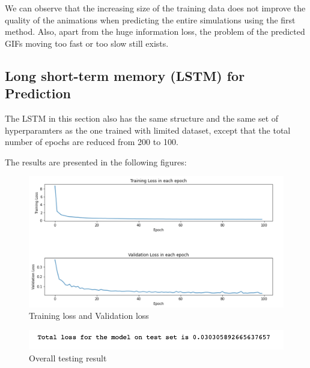 We can observe that the increasing size of the training data does not improve the quality of the animations when predicting the entire simulations using the first method. Also, apart from the huge information loss, the problem of the predicted GIFs moving too fast or too slow still exists.


\subsection{Long short-term memory (LSTM) for Prediction}

The LSTM in this section also has the same structure and the same set of hyperparamters as the one trained with limited dataset, except that the total number of epochs are reduced from 200 to 100.

The results are presented in the following figures:

\begin{figure}[H]
    \caption{Training loss and Validation loss}
    \includegraphics[scale=0.6]{Report LaTeX/figures/mantle_convection_images/larger_dataset/LSTM_trainingData.png}
\end{figure}

\begin{figure}[H]
    \caption{Overall testing result}
    \includegraphics[scale=0.8]{Report LaTeX/figures/mantle_convection_images/larger_dataset/LSTM_OverallTesting.png}
\end{figure}

